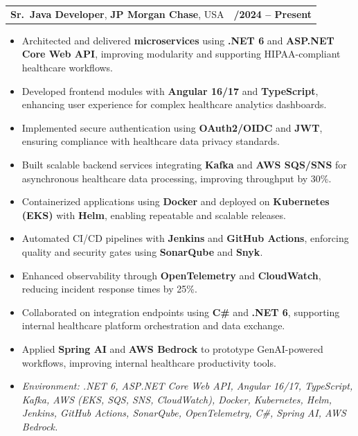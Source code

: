 \documentclass[letterpaper,11pt]{article}
\makeatletter
\newcommand{\resumeItem}[1]{
  \item\footnotesize{
    {#1 \vspace{-2pt}}
  }
}
\newcommand{\resumeSubheading}[4]{
  \vspace{-2pt}\item
    \begin{tabular*}{1.0\textwidth}[t]{l@{\extracolsep{\fill}}r}
      \textbf{\fontsize{10pt}{14pt}\selectfont #3}, \textbf{\fontsize{10pt}{14pt}\selectfont #1}, \fontsize{10pt}{14pt}\selectfont #4 & \textbf{\fontsize{10pt}{14pt}\selectfont #2} \\
    \end{tabular*}\vspace{-7pt}
}
\newcommand{\resumeItemListStart}{\begin{itemize}[leftmargin=*]}
\newcommand{\resumeItemListEnd}{\end{itemize}\vspace{-5pt}}
\makeatother
\begin{document}
\resumeSubheading
{JP Morgan Chase}{09/2024 -- Present}
{Sr.\ Java Developer}{USA}
\resumeItemListStart
  \resumeItem{Architected and delivered \textbf{microservices} using \textbf{.NET 6} and \textbf{ASP.NET Core Web API}, improving modularity and supporting HIPAA-compliant healthcare workflows.}
  \resumeItem{Developed frontend modules with \textbf{Angular 16/17} and \textbf{TypeScript}, enhancing user experience for complex healthcare analytics dashboards.}
  \resumeItem{Implemented secure authentication using \textbf{OAuth2/OIDC} and \textbf{JWT}, ensuring compliance with healthcare data privacy standards.}
  \resumeItem{Built scalable backend services integrating \textbf{Kafka} and \textbf{AWS SQS/SNS} for asynchronous healthcare data processing, improving throughput by 30\%.}
  \resumeItem{Containerized applications using \textbf{Docker} and deployed on \textbf{Kubernetes (EKS)} with \textbf{Helm}, enabling repeatable and scalable releases.}
  \resumeItem{Automated CI/CD pipelines with \textbf{Jenkins} and \textbf{GitHub Actions}, enforcing quality and security gates using \textbf{SonarQube} and \textbf{Snyk}.}
  \resumeItem{Enhanced observability through \textbf{OpenTelemetry} and \textbf{CloudWatch}, reducing incident response times by 25\%.}
  \resumeItem{Collaborated on integration endpoints using \textbf{C\#} and \textbf{.NET 6}, supporting internal healthcare platform orchestration and data exchange.}
  \resumeItem{Applied \textbf{Spring AI} and \textbf{AWS Bedrock} to prototype GenAI-powered workflows, improving internal healthcare productivity tools.}
  \resumeItem{\textit{Environment: .NET 6, ASP.NET Core Web API, Angular 16/17, TypeScript, Kafka, AWS (EKS, SQS, SNS, CloudWatch), Docker, Kubernetes, Helm, Jenkins, GitHub Actions, SonarQube, OpenTelemetry, C\#, Spring AI, AWS Bedrock.}}
\resumeItemListEnd
\end{document}
